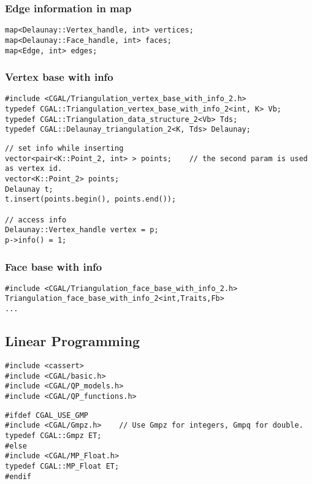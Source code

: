 \documentclass[11pt]{article}
\begin{document}
\subsubsection{Edge information in map}
\begin{lstlisting}
map<Delaunay::Vertex_handle, int> vertices;
map<Delaunay::Face_handle, int> faces;
map<Edge, int> edges;
\end{lstlisting}

\subsubsection{Vertex base with info}
\begin{lstlisting}
#include <CGAL/Triangulation_vertex_base_with_info_2.h>
typedef CGAL::Triangulation_vertex_base_with_info_2<int, K> Vb;
typedef CGAL::Triangulation_data_structure_2<Vb> Tds;
typedef CGAL::Delaunay_triangulation_2<K, Tds> Delaunay;
\end{lstlisting}

\begin{lstlisting}
// set info while inserting
vector<pair<K::Point_2, int> > points;    // the second param is used as vertex id.
vector<K::Point_2> points;
Delaunay t;
t.insert(points.begin(), points.end());

// access info
Delaunay::Vertex_handle vertex = p;
p->info() = 1;
\end{lstlisting}

\subsubsection{Face base with info}
\begin{lstlisting}
#include <CGAL/Triangulation_face_base_with_info_2.h>
Triangulation_face_base_with_info_2<int,Traits,Fb>
...
\end{lstlisting}

\subsection{Linear Programming}
\begin{lstlisting}
#include <cassert>
#include <CGAL/basic.h>
#include <CGAL/QP_models.h>
#include <CGAL/QP_functions.h>
\end{lstlisting}


\begin{lstlisting}
#ifdef CGAL_USE_GMP
#include <CGAL/Gmpz.h>    // Use Gmpz for integers, Gmpq for double.
typedef CGAL::Gmpz ET;
#else
#include <CGAL/MP_Float.h>
typedef CGAL::MP_Float ET;
#endif
\end{lstlisting}
\end{document}
